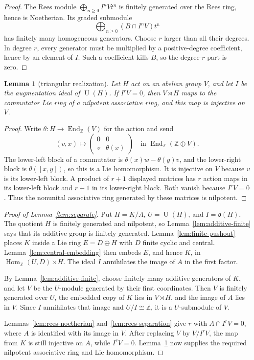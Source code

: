 \documentclass[10pt]{article}
\newtheorem{lemma}{Lemma}
\newcommand{\Z}{\mathbb Z}
\newcommand{\U}{\operatorname U}
\newcommand{\Hom}{\operatorname {Hom}}
\begin{document}
\begin{proof}
The Rees module $\bigoplus_{n\ge0}I^nVt^n$ is finitely generated over the
Rees ring, hence is Noetherian.  Its graded submodule
\[
                    \bigoplus_{n\ge0}(B\cap I^nV)t^n
\]
has finitely many homogeneous generators.  Choose $r$ larger than all their
degrees.  In degree $r$, every generator must be multiplied by a
positive-degree coefficient, hence by an element of $I$.  Such a coefficient
kills $B$, so the degree-$r$ part is zero.
\end{proof}

\begin{lemma}[triangular realization]\label{lem:triangular}
Let $H$ act on an abelian group $V$, and let $I$ be the augmentation ideal of
$\U(H)$.  If $I^rV=0$, then $V\rtimes H$ maps to the commutator Lie ring of
a nilpotent associative ring, and this map is injective on $V$.
\end{lemma}

\begin{proof}
Write $\theta:H\to\operatorname{End}_{\Z}(V)$ for the action and send
\[
 (v,x)\longmapsto
 \begin{pmatrix}0&0\\ v&\theta(x)\end{pmatrix}
 \quad\text{in }\operatorname{End}_{\Z}(\Z\oplus V).
\]
The lower-left block of a commutator is
$\theta(x)w-\theta(y)v$, and the lower-right block is $\theta([x,y])$, so
this is a Lie homomorphism.  It is injective on $V$ because $v$ is its
lower-left block.  A product of $r+1$ displayed matrices has $r$ action maps
in its lower-left block and $r+1$ in its lower-right block.  Both vanish
because $I^rV=0$.  Thus the nonunital associative ring generated by these
matrices is nilpotent.
\end{proof}

\begin{proof}[Proof of Lemma~\ref{lem:separate}]
Put $H=K/A$, $U=\U(H)$, and $I=\mathfrak d(H)$.  The quotient $H$ is
finitely generated and nilpotent, so Lemma~\ref{lem:additive-finite} says
that its additive group is finitely generated.  Lemma~\ref{lem:finite-pushout}
places $K$ inside a Lie ring $E=D\oplus H$ with $D$ finite cyclic and
central.  Lemma~\ref{lem:central-embedding} then embeds $E$, and hence $K$,
in $\Hom_{\Z}(U,D)\rtimes H$.  The ideal $I$ annihilates the image of $A$
in the first factor.

By Lemma~\ref{lem:additive-finite}, choose finitely many additive generators
of $K$, and let $V$ be the $U$-module generated by their first coordinates.
Then $V$ is finitely generated over $U$, the embedded copy of $K$ lies in
$V\rtimes H$, and the image of $A$ lies in $V$.  Since $I$ annihilates that
image and $U/I\cong\Z$, it is a $U$-submodule of $V$.

Lemmas~\ref{lem:rees-noetherian} and~\ref{lem:rees-separation} give $r$ with
$A\cap I^rV=0$, where $A$ is identified with its image in $V$.  After
replacing $V$ by $V/I^rV$, the map from $K$ is still injective on $A$, while
$I^rV=0$.  Lemma~\ref{lem:triangular} now supplies the required nilpotent
associative ring and Lie homomorphism.
\end{proof}
\end{document}
